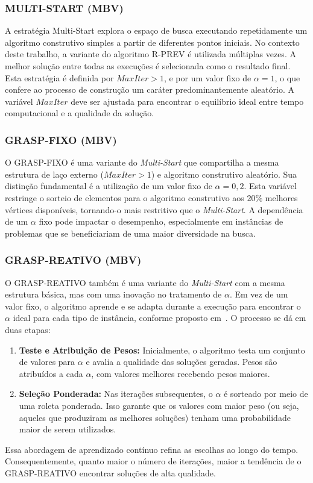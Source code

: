 \subsubsection{MULTI-START {\small (MBV)}}

A estratégia Multi-Start explora o espaço de busca executando repetidamente um algoritmo construtivo simples a partir de diferentes pontos iniciais. No contexto deste trabalho, a variante do algoritmo R-PREV é utilizada múltiplas vezes. A melhor solução entre todas as execuções é selecionada como o resultado final. Esta estratégia é definida por \textbf{$MaxIter > 1$}, e por um valor fixo de $\alpha = 1$, o que confere ao processo de construção um caráter predominantemente aleatório. A variável \textbf{$MaxIter$} deve ser ajustada para encontrar o equilíbrio ideal entre tempo computacional e a qualidade da solução.



\subsubsection{GRASP-FIXO {\small (MBV)}}

O GRASP-FIXO é uma variante do \textit{Multi-Start} que compartilha a mesma estrutura de laço externo (\textbf{$MaxIter > 1$}) e algoritmo construtivo aleatório. Sua distinção fundamental é a utilização de um valor fixo de \textbf{$\alpha = 0,2$}. Esta variável restringe o sorteio de elementos para o algoritmo construtivo aos $20\%$ melhores vértices disponíveis, tornando-o mais restritivo que o \textit{Multi-Start}. A dependência de um $\alpha$ fixo pode impactar o desempenho, especialmente em instâncias de problemas que se beneficiariam de uma maior diversidade na busca.


\subsubsection{GRASP-REATIVO {\small (MBV)}}

O GRASP-REATIVO também é uma variante do \textit{Multi-Start} com a mesma estrutura básica, mas com uma inovação no tratamento de \textbf{$\alpha$}. Em vez de um valor fixo, o algoritmo aprende e se adapta durante a execução para encontrar o $\alpha$ ideal para cada tipo de instância, conforme proposto em~\cite{feo1995grasp}. O processo se dá em duas etapas:
\begin{enumerate}
    \item \textbf{Teste e Atribuição de Pesos:} Inicialmente, o algoritmo testa um conjunto de valores para $\alpha$ e avalia a qualidade das soluções geradas. Pesos são atribuídos a cada $\alpha$, com valores melhores recebendo pesos maiores.
    \item \textbf{Seleção Ponderada:} Nas iterações subsequentes, o $\alpha$ é sorteado por meio de uma roleta ponderada. Isso garante que os valores com maior peso (ou seja, aqueles que produziram as melhores soluções) tenham uma probabilidade maior de serem utilizados.
\end{enumerate}
Essa abordagem de aprendizado contínuo refina as escolhas ao longo do tempo. Consequentemente, quanto maior o número de iterações, maior a tendência de o GRASP-REATIVO encontrar soluções de alta qualidade.